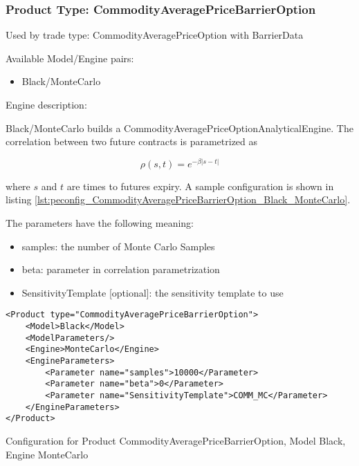 \subsubsection{Product Type: CommodityAveragePriceBarrierOption}

Used by trade type: CommodityAveragePriceOption with BarrierData

Available Model/Engine pairs:

\begin{itemize}
\item Black/MonteCarlo
\end{itemize}

Engine description:

Black/MonteCarlo builds a CommodityAveragePriceOptionAnalyticalEngine. The correlation between two future contracts is
parametrized as

$$\rho(s, t) = e^{-\beta |s-t|}$$

where $s$ and $t$ are times to futures expiry. A sample configuration is shown in listing
\ref{lst:peconfig_CommodityAveragePriceBarrierOption_Black_MonteCarlo}.

The parameters have the following meaning:

\begin{itemize}
\item samples: the number of Monte Carlo Samples
\item beta: parameter in correlation parametrization
\item SensitivityTemplate [optional]: the sensitivity template to use 
\end{itemize}

\begin{longlisting}
\begin{verbatim}
<Product type="CommodityAveragePriceBarrierOption">
    <Model>Black</Model>
    <ModelParameters/>
    <Engine>MonteCarlo</Engine>
    <EngineParameters>
        <Parameter name="samples">10000</Parameter>
        <Parameter name="beta">0</Parameter>
        <Parameter name="SensitivityTemplate">COMM_MC</Parameter>
    </EngineParameters>
</Product>
\end{verbatim}
\caption{Configuration for Product CommodityAveragePriceBarrierOption, Model Black, Engine MonteCarlo}
\label{lst:peconfig_CommodityAveragePriceBarrierOption_Black_MonteCarlo}
\end{longlisting}

